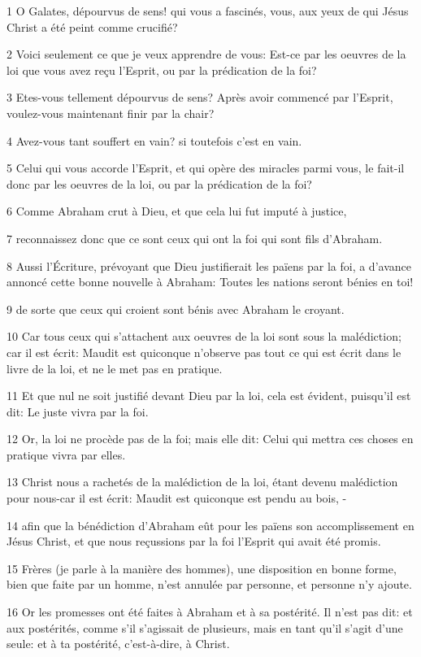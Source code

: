 \par 1 O Galates, dépourvus de sens! qui vous a fascinés, vous, aux yeux de qui Jésus Christ a été peint comme crucifié?
\par 2 Voici seulement ce que je veux apprendre de vous: Est-ce par les oeuvres de la loi que vous avez reçu l'Esprit, ou par la prédication de la foi?
\par 3 Etes-vous tellement dépourvus de sens? Après avoir commencé par l'Esprit, voulez-vous maintenant finir par la chair?
\par 4 Avez-vous tant souffert en vain? si toutefois c'est en vain.
\par 5 Celui qui vous accorde l'Esprit, et qui opère des miracles parmi vous, le fait-il donc par les oeuvres de la loi, ou par la prédication de la foi?
\par 6 Comme Abraham crut à Dieu, et que cela lui fut imputé à justice,
\par 7 reconnaissez donc que ce sont ceux qui ont la foi qui sont fils d'Abraham.
\par 8 Aussi l'Écriture, prévoyant que Dieu justifierait les païens par la foi, a d'avance annoncé cette bonne nouvelle à Abraham: Toutes les nations seront bénies en toi!
\par 9 de sorte que ceux qui croient sont bénis avec Abraham le croyant.
\par 10 Car tous ceux qui s'attachent aux oeuvres de la loi sont sous la malédiction; car il est écrit: Maudit est quiconque n'observe pas tout ce qui est écrit dans le livre de la loi, et ne le met pas en pratique.
\par 11 Et que nul ne soit justifié devant Dieu par la loi, cela est évident, puisqu'il est dit: Le juste vivra par la foi.
\par 12 Or, la loi ne procède pas de la foi; mais elle dit: Celui qui mettra ces choses en pratique vivra par elles.
\par 13 Christ nous a rachetés de la malédiction de la loi, étant devenu malédiction pour nous-car il est écrit: Maudit est quiconque est pendu au bois, -
\par 14 afin que la bénédiction d'Abraham eût pour les païens son accomplissement en Jésus Christ, et que nous reçussions par la foi l'Esprit qui avait été promis.
\par 15 Frères (je parle à la manière des hommes), une disposition en bonne forme, bien que faite par un homme, n'est annulée par personne, et personne n'y ajoute.
\par 16 Or les promesses ont été faites à Abraham et à sa postérité. Il n'est pas dit: et aux postérités, comme s'il s'agissait de plusieurs, mais en tant qu'il s'agit d'une seule: et à ta postérité, c'est-à-dire, à Christ.
